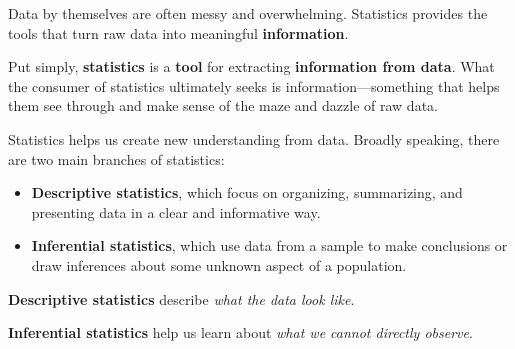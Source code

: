 \documentclass[
  letterpaper,
  DIV=11,
  numbers=noendperiod]{scrreprt}
\providecommand{\tightlist}{%
  \setlength{\itemsep}{0pt}\setlength{\parskip}{0pt}}
\begin{document}
\begin{tcolorbox}[enhanced jigsaw, coltitle=black, colbacktitle=quarto-callout-note-color!10!white, left=2mm, bottomrule=.15mm, bottomtitle=1mm, colback=white, titlerule=0mm, colframe=quarto-callout-note-color-frame, breakable, leftrule=.75mm, toptitle=1mm, opacitybacktitle=0.6, rightrule=.15mm, title=\textcolor{quarto-callout-note-color}{\faInfo}\hspace{0.5em}{Big picture}, arc=.35mm, opacityback=0, toprule=.15mm]

Data by themselves are often messy and overwhelming. Statistics provides
the tools that turn raw data into meaningful \textbf{information}.

\end{tcolorbox}

Put simply, \textbf{statistics} is a \textbf{tool} for extracting
\textbf{information from data}. What the consumer of statistics
ultimately seeks is information---something that helps them see through
and make sense of the maze and dazzle of raw data.

Statistics helps us create new understanding from data. Broadly
speaking, there are two main branches of statistics:

\begin{itemize}
\tightlist
\item
  \textbf{Descriptive statistics}, which focus on organizing,
  summarizing, and presenting data in a clear and informative way.
\item
  \textbf{Inferential statistics}, which use data from a sample to make
  conclusions or draw inferences about some unknown aspect of a
  population.
\end{itemize}

\begin{tcolorbox}[enhanced jigsaw, coltitle=black, colbacktitle=quarto-callout-important-color!10!white, left=2mm, bottomrule=.15mm, bottomtitle=1mm, colback=white, titlerule=0mm, colframe=quarto-callout-important-color-frame, breakable, leftrule=.75mm, toptitle=1mm, opacitybacktitle=0.6, rightrule=.15mm, title=\textcolor{quarto-callout-important-color}{\faExclamation}\hspace{0.5em}{Key idea}, arc=.35mm, opacityback=0, toprule=.15mm]

\textbf{Descriptive statistics} describe \emph{what the data look like}.

\textbf{Inferential statistics} help us learn about \emph{what we cannot
directly observe}.

\end{tcolorbox}
\end{document}
